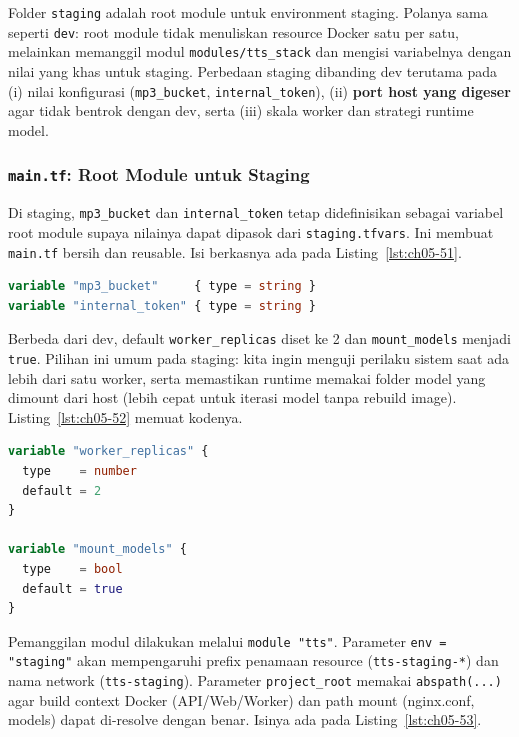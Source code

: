 Folder \texttt{staging} adalah root module untuk environment staging. Polanya sama seperti \texttt{dev}: root module tidak menuliskan resource Docker satu per satu, melainkan memanggil modul \texttt{modules/tts\_stack} dan mengisi variabelnya dengan nilai yang khas untuk staging. Perbedaan staging dibanding dev terutama pada (i) nilai konfigurasi (\texttt{mp3\_bucket}, \texttt{internal\_token}), (ii) \textbf{port host yang digeser} agar tidak bentrok dengan dev, serta (iii) skala worker dan strategi runtime model.

\subsubsection{\texttt{main.tf}: Root Module untuk Staging}

Di staging, \texttt{mp3\_bucket} dan \texttt{internal\_token} tetap didefinisikan sebagai variabel root module supaya nilainya dapat dipasok dari \texttt{staging.tfvars}. Ini membuat \texttt{main.tf} bersih dan reusable. Isi berkasnya ada pada Listing~\ref{lst:ch05-51}.

\begin{lstlisting}[language=terraform, caption={Potongan staging/main.tf: variabel yang diisi dari staging.tfvars}, label={lst:ch05-51}]
variable "mp3_bucket"     { type = string }
variable "internal_token" { type = string }
\end{lstlisting}

Berbeda dari dev, default \texttt{worker\_replicas} diset ke 2 dan \texttt{mount\_models} menjadi \texttt{true}. Pilihan ini umum pada staging: kita ingin menguji perilaku sistem saat ada lebih dari satu worker, serta memastikan runtime memakai folder model yang dimount dari host (lebih cepat untuk iterasi model tanpa rebuild image). Listing~\ref{lst:ch05-52} memuat kodenya.

\begin{lstlisting}[language=terraform, caption={Potongan kode Terraform pada main.tf (10)}, label={lst:ch05-52}]
variable "worker_replicas" {
  type    = number
  default = 2
}

variable "mount_models" {
  type    = bool
  default = true
}
\end{lstlisting}

Pemanggilan modul dilakukan melalui \texttt{module "tts"}. Parameter \texttt{env = "staging"} akan mempengaruhi prefix penamaan resource (\texttt{tts-staging-*}) dan nama network (\texttt{tts-staging}). Parameter \texttt{project\_root} memakai \texttt{abspath(...)} agar build context Docker (API/Web/Worker) dan path mount (nginx.conf, models) dapat di-resolve dengan benar. Isinya ada pada Listing~\ref{lst:ch05-53}.

